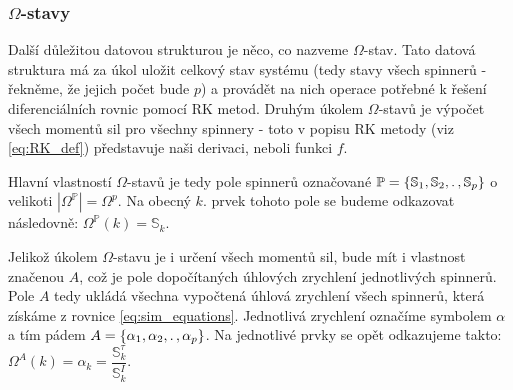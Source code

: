 \documentclass[12pt, a4paper,
 twoside,        %
 openright
]{report}
\begin{document}
\clearpage

\DFNtrysingle
\DFNinhibitcbreak
{}\textwidth

\subsubsection{$\Omega$-stavy}

Další důležitou datovou strukturou je něco, co nazveme $\Omega$-stav. Tato datová struktura má za úkol uložit celkový stav systému (tedy stavy všech spinnerů - řekněme, že jejich počet bude $p$) a provádět na nich operace potřebné k řešení diferenciálních rovnic pomocí RK metod. Druhým úkolem $\Omega$-stavů je výpočet všech momentů sil pro všechny spinnery - toto v popisu RK metody (viz \autoref{eq:RK_def}) představuje naši derivaci, neboli funkci $f$.

Hlavní vlastností $\Omega$-stavů je tedy pole spinnerů označované $\mathbb{P} = \{ \mathbb{S}_1, \mathbb{S}_2, \ldotp ,\mathbb{S}_p \}$ o velikoti $|\Omega_{}^{\mathbb{P}}| = \Omega_{}^{p}$. Na obecný $k$. prvek tohoto pole se budeme odkazovat následovně: $\Omega_{}^{\mathbb{P}}(k) = \mathbb{S}_k$.

Jelikož úkolem $\Omega$-stavu je i určení všech momentů sil, bude mít i vlastnost značenou $A$, což je pole dopočítaných úhlových zrychlení jednotlivých spinnerů. Pole $A$ tedy ukládá všechna vypočtená úhlová zrychlení všech spinnerů, která získáme z rovnice \ref{eq:sim_equations}. Jednotlivá zrychlení označíme symbolem $\alpha$ a tím pádem $A = \{ \alpha_1, \alpha_2, \ldotp, \alpha_p \} $. Na jednotlivé prvky se opět odkazujeme takto: $\Omega_{}^{A}(k) = \alpha_k = \dfrac{\mathbb{S}_k^\tau}{\mathbb{S}_k^I}$. 
\end{document}
